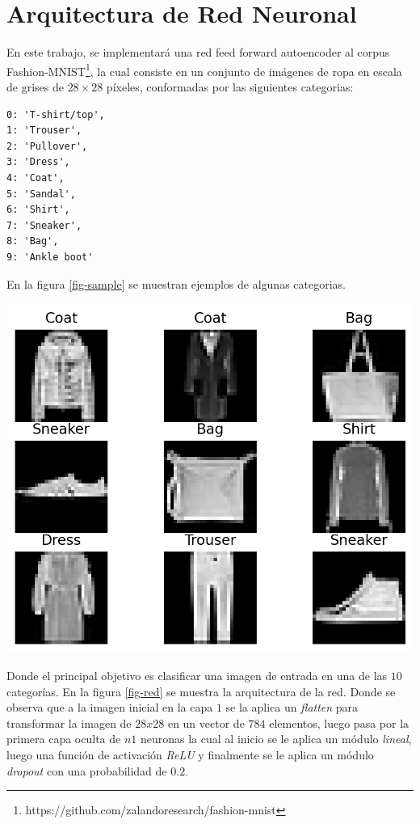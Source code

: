 \documentclass[aps,prl,reprint,groupedaddress]{revtex4-2}
\newenvironment{Figura}
  {\par\medskip\noindent\minipage{\linewidth}}
  {\endminipage\par\medskip}
\begin{document}
\section{Arquitectura de Red Neuronal}
En este trabajo, se implementará una red feed forward autoencoder al corpus 
Fashion-MNIST\footnote{https://github.com/zalandoresearch/fashion-mnist}, la 
cual consiste en un conjunto de imágenes de ropa en escala de grises de 
$28\times 28$ píxeles, conformadas por las siguientes categorias:
\begin{verbatim}
0: 'T-shirt/top',
1: 'Trouser',
2: 'Pullover',
3: 'Dress',
4: 'Coat',
5: 'Sandal',
6: 'Shirt',
7: 'Sneaker',
8: 'Bag',
9: 'Ankle boot'
\end{verbatim}

En la figura \ref{fig-sample} se muestran ejemplos de algunas categorias.
\begin{Figura}
  \centering
  \includegraphics[width=1\textwidth]{figs/sample.png}
  \label{fig-sample}
\end{Figura}

Donde el principal objetivo es clasificar una imagen de entrada en una de las 
$10$ categorías. En la figura \ref{fig-red} se muestra la arquitectura de la red.
Donde se observa que a la imagen inicial en la capa $1$ se la aplica un 
\textit{flatten} para transformar la imagen de $28x28$ en un vector de $784$ 
elementos, luego pasa por la primera capa oculta de $n1$ neuronas la cual al 
inicio se le aplica un módulo \textit{lineal}, luego una función de activación 
\textit{ReLU} y finalmente se le aplica un módulo \textit{dropout} con una 
probabilidad de $0.2$.
\end{document}
